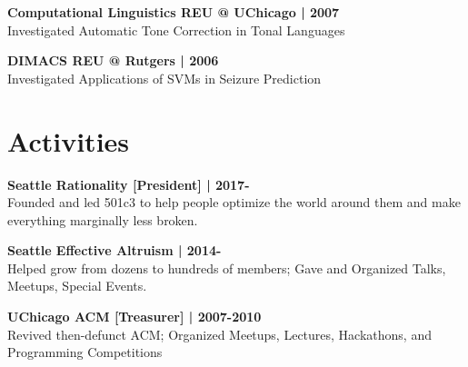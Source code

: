 \documentclass[]{resume}
\begin{document}
\begin{minipage}[t]{0.33\textwidth}
\textbf{Computational Linguistics REU @ UChicago | 2007}\\
Investigated Automatic Tone Correction in Tonal Languages\\
\sectionsep

\textbf{DIMACS REU @ Rutgers | 2006}\\
Investigated Applications of SVMs in Seizure Prediction







\section{Activities} 
\textbf{Seattle Rationality [President] | 2017-}\\
Founded and led 501c3 to help people optimize the world
around them and make everything marginally less broken.
\sectionsep

\textbf{Seattle Effective Altruism | 2014-}\\
Helped grow from dozens to hundreds of members;
Gave and Organized Talks, Meetups, Special Events.\\
\sectionsep

\textbf{UChicago ACM [Treasurer] | 2007-2010} \\
Revived then-defunct ACM; Organized Meetups, Lectures, 
Hackathons, and Programming Competitions \\
\sectionsep


\end{minipage}
\end{document}
